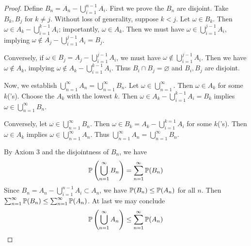 \documentclass[a4paper]{article}
\begin{document}
\begin{proof}[Proof] 
	Define \(B_{n} = A_{n} - \bigcup_{i=1}^{n-1} A_{i} \). First we prove the \(B_{n}\) are disjoint. Take \(B_{k}, B_{j}\) for \(k \neq j\). Without loss of generality, suppose \(k < j\). Let \(\omega \in B_{k}\). Then \(\omega \in A_{k} - \bigcup_{i=1}^{k-1} A_{i} \); importantly, \(\omega \in A_{k}\). Then we must have \(\omega \in \bigcup_{i=1}^{j-1} A_{i} \), implying \(\omega \not\in A_{j} - \bigcup_{i=1}^{j-1} A_{i} = B_{j} \).

	Conversely, if \(\omega \in B_{j} = A_{j} - \bigcup_{i=1}^{j-1} A_{i} \), we must have \(\omega \not\in \bigcup_{i=1}^{j-1} A_{i}\). Then we have \(\omega \not\in A_{k}\), implying \(\omega \not\in A_{k} - \bigcup_{i=1}^{k-1} A_{i} \). Thus \(B_{i} \cap B_{j} = \varnothing\) and \(B_{i}, B_{j}\) are disjoint.

	Now, we establish \(\bigcup_{n=1}^{\infty} A_{n} = \bigcup_{n=1}^{\infty} B_{n} \). Let \(\omega \in \bigcup_{n=1}^{\infty} \). Then \(\omega \in A_{k}\) for some \(k\)('s). Choose the \(A_{k}\) with the lowest \(k\). Then \(\omega \in A_{k} - \bigcup_{i=1}^{k-1} A_{i} = B_{k} \) implies \(\omega \in \bigcup_{n=1}^{\infty} B_{n} \).

	Conversely, let \(\omega \in \bigcup_{n=1}^{\infty} B_{n} \). Then \(\omega \in B_{k} = A_{k} - \bigcup_{i=1}^{k=1} A_{i} \) for some \(k\)('s). Then \(\omega \in A_{k}\) implies \(\omega \in \bigcup_{n=1}^{\infty} A_{n} \). Thus \(\bigcup_{n=1}^{\infty} A_{n} = \bigcup_{n=1}^{\infty} B_{n}  \).

	By Axiom 3 and the disjointness of \(B_{n}\), we have
\[
	\mathbb{P}\left(\bigcup_{n=1}^{\infty} B_{n} \right) = \sum_{n=1}^{\infty} \mathbb{P}(B_{n})
\]
Since \(B_{n} = A_{n} - \bigcup_{i=1}^{n-1} A_{i} \subset A_{n} \), we have \(\mathbb{P}(B_{n}) \le \mathbb{P}(A_{n})\) for all \(n\). Then \(\sum_{n=1}^{\infty} \mathbb{P}(B_{n}) \le \sum_{n=1}^{\infty} \mathbb{P}(A_{n})\). At last we may conclude
\[
	\mathbb{P}\left(\bigcup_{n=1}^{\infty} A_{n}  \right) \le \sum_{n=1}^{\infty} \mathbb{P}(A_{n})
\]
\end{proof}

\end{document}
